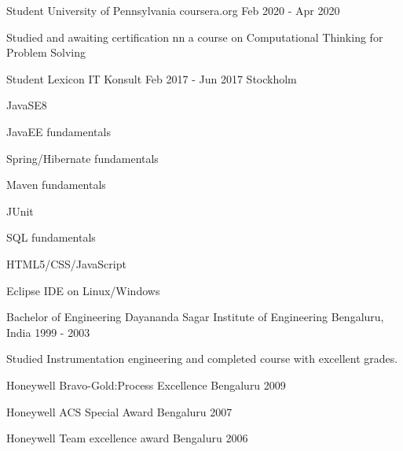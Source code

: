 \documentclass[11pt, a4paper]{awesome-cv}
\begin{document}

  \begin{cventries}
    \cventry
      {Student}
      {University of Pennsylvania}
      {coursera.org}
      {Feb 2020 - Apr 2020}
      {
        \begin{cvitems}
        \item {Studied and awaiting certification nn a course on Computational Thinking for Problem Solving}
        \end{cvitems}
      }

      \cventry
      {Student}
      {Lexicon IT Konsult}
      {Feb 2017 - Jun 2017}
      {Stockholm}
      {
        \begin{cvitems}
          \item JavaSE8
          \item JavaEE fundamentals
          \item Spring/Hibernate fundamentals
          \item Maven fundamentals
          \item JUnit
          \item SQL fundamentals
          \item HTML5/CSS/JavaScript
          \item Eclipse IDE on Linux/Windows
           \end{cvitems}
      }

    \cventry
      {Bachelor of Engineering}
      {Dayananda Sagar Institute of Engineering}
      {Bengaluru, India}
      {1999 - 2003}
      {
        \begin{cvitems}
        \item {Studied Instrumentation engineering and completed course with excellent grades.}
        \end{cvitems}
      }
  \end{cventries}

  \begin{cvhonors}

      \cvhonor
      {Honeywell}
      {Bravo-Gold:Process Excellence}
      {Bengaluru}
      {2009}
      
      \cvhonor
      {Honeywell}
      {ACS Special Award}
      {Bengaluru}
      {2007}

      \cvhonor
      {Honeywell}
      {Team excellence award}
      {Bengaluru}
      {2006}
  \end{cvhonors}
\end{document}
